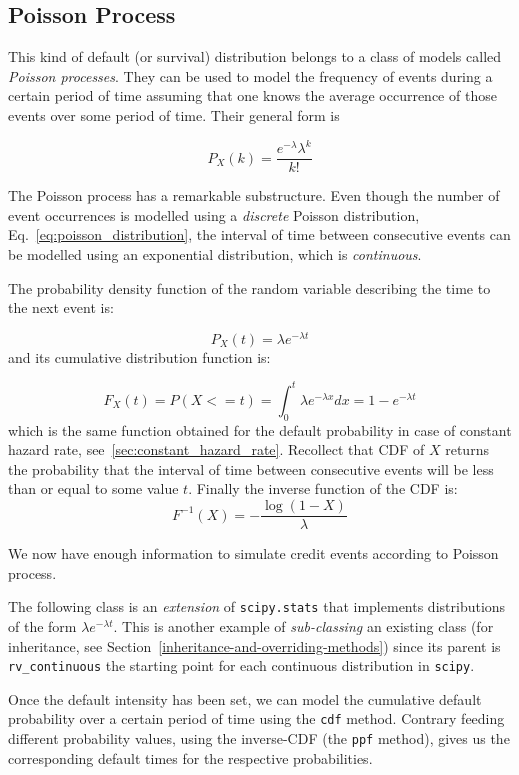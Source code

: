 \subsection{Poisson Process}
\label{sec:poisson_process}
This kind of default (or survival) distribution belongs to a class of models called \emph{Poisson processes}. 
They can be used to model the frequency of events during a certain period of time assuming that one knows the average occurrence of those events over some period of time. 
Their general form is

\begin{equation}
P_X(k) = \frac{e^{-\lambda} \lambda^{k}}{k!}
\label{eq:poisson_distribution}
\end{equation}

The Poisson process has a remarkable substructure. Even though the number of event occurrences is modelled using a \emph{discrete} Poisson distribution, Eq.~\ref{eq:poisson_distribution}, the interval of time between consecutive events can be modelled using an exponential distribution, which is \emph{continuous}.

The probability density function of the random variable describing the time to the next event is:

\begin{equation}
P_X(t) = \lambda e^{-\lambda t}
\label{eq:inter-arrival}
\end{equation}
and its cumulative distribution function is:

\begin{equation}
F_X(t) = P(X<=t) = \int_{0}^{t}\lambda e^{-\lambda x} dx = 1 - e^{-\lambda t}
\label{eq:inter-arrival}
\end{equation}
which is the same function obtained for the default probability in case of constant hazard rate, see~\ref{sec:constant_hazard_rate}.
Recollect that CDF of $X$ returns the probability that the interval of time between consecutive events will be less than or equal to some value $t$.
Finally the inverse function of the CDF is:
\begin{equation}
F^{-1}(X) = -\frac{\log(1-X)}{\lambda}
\end{equation}

\begin{finmarkets}
We now have enough information to simulate credit events according to Poisson process. 

The following class is an \emph{extension} of \texttt{scipy.stats} that implements distributions of the form $\lambda e^{-\lambda t}$. This is another example of \emph{sub-classing} an existing class (for inheritance, see Section~\ref{inheritance-and-overriding-methods}) since its parent is \texttt{rv\_continuous} the starting point for each continuous distribution in \texttt{scipy}.

Once the default intensity has been set, we can model the cumulative default probability over a certain period of time using the \texttt{cdf} method. Contrary feeding different probability values, using the inverse-CDF (the \texttt{ppf} method), gives us the corresponding default times for the respective probabilities.
\end{finmarkets}

